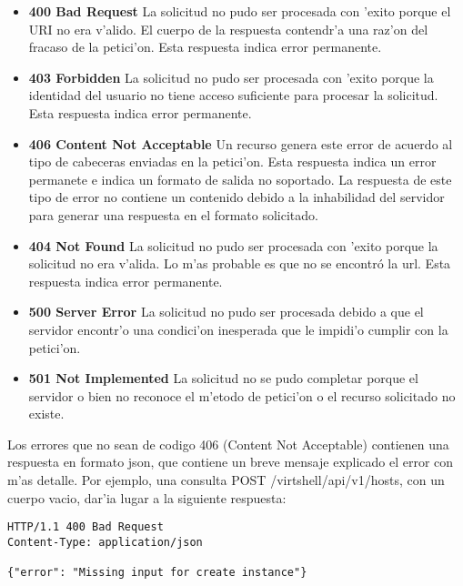 \begin{itemize}
\item \textbf{400 Bad Request} La solicitud no pudo ser procesada con 'exito porque el URI no era v'alido. El cuerpo de la respuesta contendr'a una raz'on del fracaso de la petici'on. Esta respuesta indica error permanente.

\item \textbf{403 Forbidden} La solicitud no pudo ser procesada con 'exito porque la identidad del usuario no tiene acceso suficiente para procesar la solicitud. Esta respuesta indica error permanente.

\item \textbf{406 Content Not Acceptable} Un recurso genera este error de acuerdo al tipo de cabeceras enviadas en la petici'on. Esta respuesta indica un error permanete e indica un formato de salida no soportado. La respuesta de este tipo de error no contiene un contenido debido a la inhabilidad del servidor para generar una respuesta en el formato solicitado.

\item \textbf{404 Not Found} La solicitud no pudo ser procesada con 'exito porque la solicitud no era v'alida. Lo m'as probable es que no se encontró la url. Esta respuesta indica error permanente.

\item \textbf{500 Server Error} La solicitud no pudo ser procesada debido a que el servidor encontr'o una condici'on inesperada que le impidi'o cumplir con la petici'on.

\item \textbf{501 Not Implemented} La solicitud no se pudo completar porque el servidor o bien no reconoce el m'etodo de petici'on o el recurso solicitado no existe.

\end{itemize}

Los errores que no sean de codigo 406 (Content Not Acceptable) contienen una respuesta en formato json, que contiene un breve mensaje explicado el error con m'as detalle. Por ejemplo, una consulta POST /virtshell/api/v1/hosts, con un cuerpo vacio, dar'ia lugar a la siguiente respuesta:

\vspace{1cm}
\begin{lstlisting}[style=json]
HTTP/1.1 400 Bad Request
Content-Type: application/json

{"error": "Missing input for create instance"}
\end{lstlisting}

